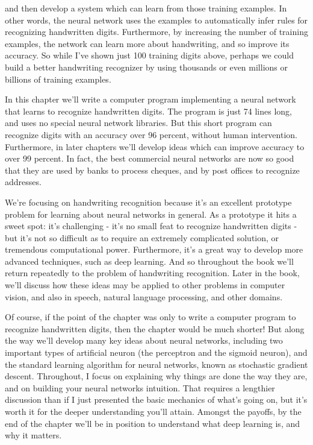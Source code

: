 and then develop a system which can learn from those training examples. In other words, the neural network uses the examples to automatically infer rules for recognizing handwritten digits. Furthermore, by increasing the number of training examples, the network can learn more about handwriting, and so improve its accuracy. So while I've shown just 100 training digits above, perhaps we could build a better handwriting recognizer by using thousands or even millions or billions of training examples.

In this chapter we'll write a computer program implementing a neural network that learns to recognize handwritten digits. The program is just 74 lines long, and uses no special neural network libraries. But this short program can recognize digits with an accuracy over 96 percent, without human intervention. Furthermore, in later chapters we'll develop ideas which can improve accuracy to over 99 percent. In fact, the best commercial neural networks are now so good that they are used by banks to process cheques, and by post offices to recognize addresses.

We're focusing on handwriting recognition because it's an excellent prototype problem for learning about neural networks in general. As a prototype it hits a sweet spot: it's challenging - it's no small feat to recognize handwritten digits - but it's not so difficult as to require an extremely complicated solution, or tremendous computational power. Furthermore, it's a great way to develop more advanced techniques, such as deep learning. And so throughout the book we'll return repeatedly to the problem of handwriting recognition. Later in the book, we'll discuss how these ideas may be applied to other problems in computer vision, and also in speech, natural language processing, and other domains.

Of course, if the point of the chapter was only to write a computer program to recognize handwritten digits, then the chapter would be much shorter! But along the way we'll develop many key ideas about neural networks, including two important types of artificial neuron (the perceptron and the sigmoid neuron), and the standard learning algorithm for neural networks, known as stochastic gradient descent. Throughout, I focus on explaining why things are done the way they are, and on building your neural networks intuition. That requires a lengthier discussion than if I just presented the basic mechanics of what's going on, but it's worth it for the deeper understanding you'll attain. Amongst the payoffs, by the end of the chapter we'll be in position to understand what deep learning is, and why it matters.


